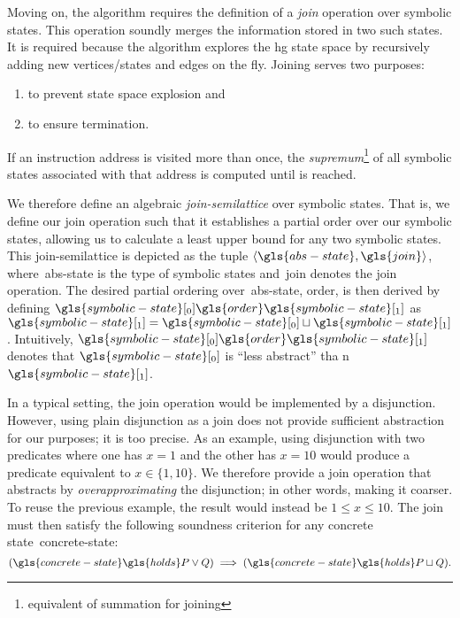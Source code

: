 Moving on, the algorithm requires the definition of a \emph{join} operation over symbolic states.
This operation soundly merges the information stored in two such states.
It is required because the algorithm explores the \ac{hg} state space by recursively adding new vertices/states and edges on the fly.
Joining serves two purposes:
\begin{enumerate}
  \item to prevent state space explosion and
  \item to ensure termination.
\end{enumerate}
If an instruction address is visited more than once,
the \emph{supremum}\footnote{equivalent of summation for joining}
of all symbolic states associated with that address
is computed until  is reached.

We therefore define an algebraic \emph{join-semilattice}
over symbolic states.
That is, we define our join operation
such that it establishes a partial order over our symbolic states,
allowing us to calculate a least upper bound for any two symbolic states.
This join-semilattice is depicted as the tuple $\langle\gls{abs-state},\gls{join}\rangle$,
where~\gls{abs-state} is the type of symbolic states
and~\gls{join} denotes the join operation.
The desired partial ordering over~\gls{abs-state}, \gls{order}, is then derived
by defining $\gls{symbolic-state}[_0] \gls{order} \gls{symbolic-state}[_1]$ as $\gls{symbolic-state}[_1] = \gls{symbolic-state}[_0] \sqcup \gls{symbolic-state}[_1]$.
Intuitively, $\gls{symbolic-state}[_0] \gls{order} \gls{symbolic-state}[_1]$ denotes that $\gls{symbolic-state}[_0]$ is ``less abstract'' tha	n $\gls{symbolic-state}[_1]$.

In a typical setting, the join operation would be implemented by a disjunction.
However, using plain disjunction as a join does not provide sufficient abstraction for our purposes; it is too precise.
As an example, using disjunction with two predicates where one has $x=1$ and the other has $x=10$ would produce a predicate equivalent to $x\in\{1,10\}$.
We therefore provide a join operation that abstracts
by \emph{overapproximating} the disjunction; in other words, making it coarser.
To reuse the previous example, the result would instead be $1\leq x\leq 10$.
The join must then satisfy the following soundness criterion
for any concrete state~\gls{concrete-state}:
\begin{equation}
  (\gls{concrete-state}\gls{holds}P \lor Q) \implies (\gls{concrete-state}\gls{holds}P\sqcup Q).
\end{equation}

